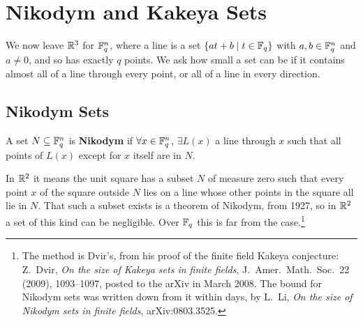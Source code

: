 \section{Nikodym and Kakeya Sets}

We now leave $\mathbb{R}^3$ for $\mathbb{F}_q^n$, where a line is a set $\left\{ at + b \; \middle\vert \; t \in \mathbb{F}_q \right\}$ with $a, b \in \mathbb{F}_q^n$ and $a \neq 0$, and so has exactly $q$ points. We ask how small a set can be if it contains almost all of a line through every point, or all of a line in every direction.

\subsection{Nikodym Sets}

\begin{boxdefinition}
    A set $N \subseteq \mathbb{F}_q^n$ is \textbf{Nikodym} if $\forall x \in \mathbb{F}_q^n$, $\exists L(x)$ a line through $x$ such that all points of $L(x)$ except for $x$ itself are in $N$.
\end{boxdefinition}

In $\mathbb{R}^2$ it means the unit square has a subset $N$ of measure zero such that every point $x$ of the square outside $N$ lies on a line whose other points in the square all lie in $N$. That such a subset exists is a theorem of Nikodym, from 1927, so in $\mathbb{R}^2$ a set of this kind can be negligible. Over $\mathbb{F}_q$ this is far from the case.\footnote{The method is Dvir's, from his proof of the finite field Kakeya conjecture: Z.~Dvir, \textit{On the size of Kakeya sets in finite fields}, J.~Amer.~Math.~Soc.~22 (2009), 1093--1097, posted to the arXiv in March 2008. The bound for Nikodym sets was written down from it within days, by L.~Li, \textit{On the size of Nikodym sets in finite fields}, arXiv:0803.3525.}

